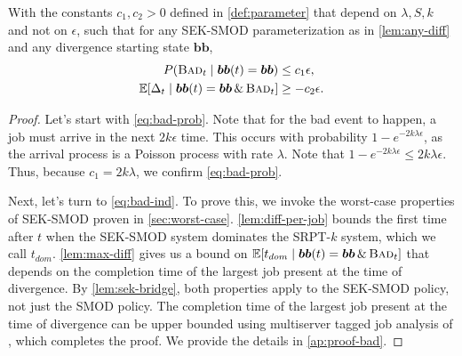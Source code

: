 \documentclass[acmsmall]{acmart}
\newcommand{\E}[1]{\mathbb{E}[#1]}
\newcommand{\bb}{\boldsymbol{b}}
\newcommand{\bbb}{\bb\bb}
\newcommand{\bad}{\textsc{Bad}}
\begin{document}
\begin{lemma}
    \label{lem:bad}
    With the constants $c_1, c_2 > 0$ defined in \cref{def:parameter} that depend on $\lambda, S, k$ and not on $\epsilon$, such that for any SEK-SMOD parameterization as in \cref{lem:any-diff} and any divergence starting state $\bbb$,
    \begin{align}
    \label{eq:bad-prob}
        P(\bad_t \mid \bbb(t) = \bbb) &\le c_1 \epsilon,    \\
    \label{eq:bad-ind}
        \E{\Delta_t \mid\bbb(t) = \bbb \,\&\, \bad_t} &\ge - c_2 \epsilon.
    \end{align}
\end{lemma}
\begin{proof}
    Let's start with \eqref{eq:bad-prob}. 
    Note that for the bad event to happen,
    a job must arrive in the next $2k\epsilon$ time.
    This occurs with probability $1 - e^{-{2k\lambda \epsilon }}$, as the arrival process is a Poisson process with rate $\lambda$. Note that $1 - e^{-{2k\lambda\epsilon}} \le 2k\lambda \epsilon$. 
    Thus, because $c_1 = 2k\lambda$, we confirm \eqref{eq:bad-prob}.

    Next, let's turn to \eqref{eq:bad-ind}.
    To prove this, we invoke the worst-case properties of SEK-SMOD proven in \cref{sec:worst-case}.
    \cref{lem:diff-per-job} bounds the first time after $t$ when the SEK-SMOD system dominates the SRPT-$k$ system, which we call $t_{dom}$. \cref{lem:max-diff} gives us a bound on $\E{t_{dom} \mid\bbb(t) = \bbb \,\&\, \bad_t}$ that depends on the completion time of the largest job present at the time of divergence.
    By \cref{lem:sek-bridge}, both properties apply to the SEK-SMOD policy, not just the SMOD policy.
    The completion time of the largest job present at the time of divergence can be upper bounded using multiserver tagged job analysis of \cite{grosof-etal-2019-srpt-k}, which completes the proof. We provide the details in \cref{ap:proof-bad}.
\end{proof}
\end{document}
